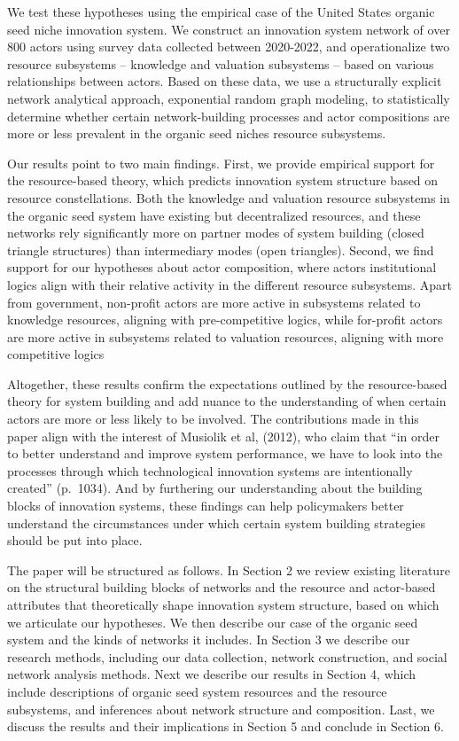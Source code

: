 \documentclass[twoside,12pt,final]{ucthesis-CA2012}
\begin{document}
\begin{ucmainmatter}
We test these hypotheses using the empirical case of the United States
organic seed niche innovation system. We construct an innovation system
network of over 800 actors using survey data collected between
2020-2022, and operationalize two resource subsystems -- knowledge and
valuation subsystems -- based on various relationships between actors.
Based on these data, we use a structurally explicit network analytical
approach, exponential random graph modeling, to statistically determine
whether certain network-building processes and actor compositions are
more or less prevalent in the organic seed niche\textquotesingle s resource subsystems.

Our results point to two main findings. First, we provide empirical
support for the resource-based theory, which predicts innovation system
structure based on resource constellations. Both the knowledge and
valuation resource subsystems in the organic seed system have existing
but decentralized resources, and these networks rely significantly more
on \textquotesingle partner modes\textquotesingle{} of system building (closed triangle structures)
than \textquotesingle intermediary modes\textquotesingle{} (open triangles). Second, we find support
for our hypotheses about actor composition, where actors\textquotesingle{} institutional
logics align with their relative activity in the different resource
subsystems. Apart from government, non-profit actors are more active in
subsystems related to knowledge resources, aligning with pre-competitive
logics, while for-profit actors are more active in subsystems related to
valuation resources, aligning with more competitive logics

Altogether, these results confirm the expectations outlined by the
resource-based theory for system building and add nuance to the
understanding of when certain actors are more or less likely to be
involved. The contributions made in this paper align with the interest
of Musiolik et al, (2012), who claim that ``in order to better
understand and improve system performance, we have to look into the
processes through which technological innovation systems are
intentionally created'' (p.~1034). And by furthering our understanding
about the building blocks of innovation systems, these findings can help
policymakers better understand the circumstances under which certain
system building strategies should be put into place.

The paper will be structured as follows. In Section 2 we review existing
literature on the structural building blocks of networks and the
resource and actor-based attributes that theoretically shape innovation
system structure, based on which we articulate our hypotheses. We then
describe our case of the organic seed system and the kinds of networks
it includes. In Section 3 we describe our research methods, including
our data collection, network construction, and social network analysis
methods. Next we describe our results in Section 4, which include
descriptions of organic seed system resources and the resource
subsystems, and inferences about network structure and composition.
Last, we discuss the results and their implications in Section 5 and
conclude in Section 6.


\end{ucmainmatter}
\end{document}
